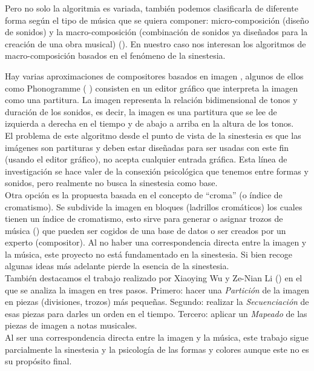 Pero no solo la algoritmia es variada, también podemos clasificarla de diferente forma según el tipo de música que se quiera componer: micro-composición (diseño de sonidos) y la macro-composición (combinación de sonidos ya diseñados para la creación de una obra musical) (\cite{AudioVisualSurvey}). \color{blue} En nuestro caso nos interesan los algoritmos de macro-composición basados en el fenómeno de la sinestesia.\\ \color{black}

Hay varias aproximaciones de compositores basados en imagen , algunos de ellos como Phonogramme (\cite{ImageBaseComposition} \cite{Phonogramme}) consisten en un editor gráfico que interpreta la imagen como una partitura. La imagen representa la relación bidimensional de tonos y duración de los sonidos, es decir, la imagen es una partitura que se lee de izquierda a derecha en el tiempo y de abajo a arriba en la altura de los tonos. 
\\El problema de este algoritmo desde el punto de vista de la sinestesia es que las imágenes son partituras y deben estar diseñadas para ser usadas con este fin (usando el editor gráfico), no acepta cualquier entrada gráfica. Esta línea de investigación se hace valer de la consexión psicológica que tenemos entre formas y sonidos, pero realmente no busca la sinestesia como base.\\

Otra opción es la propuesta basada en el concepto de ``croma'' (o índice de cromatismo). Se subdivide la imagen en bloques (ladrillos cromáticos) los cuales tienen un índice de cromatismo, esto sirve para generar o asignar trozos de música (\cite{bricksConvertsMusic}) que pueden ser cogidos de una base de datos o ser creados por un experto (compositor). Al no haber una correspondencia directa entre la imagen y la música, este proyecto no está fundamentado en la sinestesia. Si bien recoge algunas ideas más adelante pierde la esencia de la sinestesia.\\

También destacamos el trabajo realizado por Xiaoying Wu y Ze-Nian Li (\cite{ImageBaseComposition}) en el que se analiza la imagen en tres pasos. Primero: hacer una \emph{Partición} de la imagen en piezas (divisiones, trozos) más pequeñas. Segundo: realizar la \emph{Secuenciación} de esas piezas para darles un orden en el tiempo. Tercero: aplicar un \emph{Mapeado} de las piezas de imagen a notas musicales.
\\Al ser una correspondencia directa entre la imagen y la música, este trabajo sigue parcialmente la sinestesia y la psicología de las formas y colores aunque este no es su propósito final.\\ 

